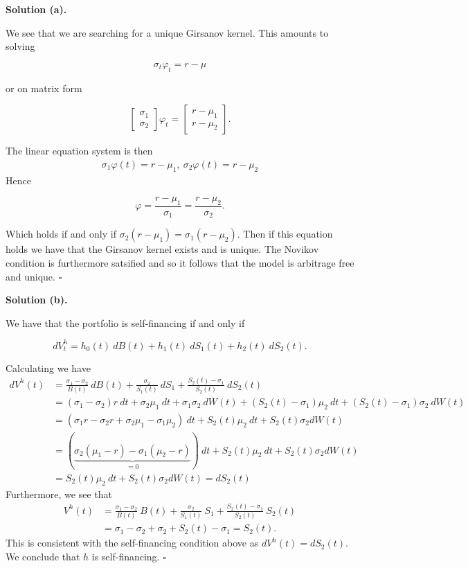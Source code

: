 \documentclass[a4paper,12pt,openany]{book}
\begin{document}
\textbf{Solution (a).}

We see that we are searching for a unique Girsanov kernel. This amounts to solving

\[
\sigma_t\varphi_t=r-\mu
\]

or on matrix form

\[
\begin{bmatrix}
\sigma_1 \\
\sigma_2
\end{bmatrix}
\varphi_t=
\begin{bmatrix}
r-\mu_1\\
r-\mu_2
\end{bmatrix}.
\]

The linear equation system is then
\begin{align*}
\sigma_1\varphi(t)=r-\mu_1,\ \sigma_2\varphi(t)=r-\mu_2
\end{align*}
Hence

\[
\varphi=\frac{r-\mu_1}{\sigma_1}=\frac{r-\mu_2}{\sigma_2}.
\]

Which holds if and only if \(\sigma_2(r-\mu_1)=\sigma_1(r-\mu_2)\). Then if this equation holds we have that the Girsanov kernel exists and is unique. The Novikov condition is furthermore satsified and so it follows that the model is arbitrage free and unique. \(\square\)

\noindent\makebox[\linewidth]{\rule{\textwidth}{0.4pt}}

\textbf{Solution (b).}

We have that the portfolio is self-financing if and only if

\[
dV_t^h=h_0(t)\ dB(t)+h_1(t)\ dS_1(t)+h_2(t)\ dS_2(t).
\]

Calculating we have
\begin{align*}
dV^h(t)&=\frac{\sigma_1-\sigma_2}{B(t)}\ dB(t)+\frac{\sigma_2}{S_1(t)}\ dS_1+\frac{S_2(t)-\sigma_1}{S_2(t)}\ dS_2(t)\\
&=(\sigma_1-\sigma_2)r\ dt+\sigma_2\mu_1\ dt+\sigma_1\sigma_2\ dW(t)+(S_2(t)-\sigma_1)\mu_2\ dt+(S_2(t)-\sigma_1)\sigma_2\ dW(t)\\
&=(\sigma_1r-\sigma_2r+\sigma_2\mu_1-\sigma_1\mu_2)\ dt+S_2(t)\mu_2\ dt+S_2(t)\sigma_2dW(t)\\
&=(\underbrace{\sigma_2(\mu_1-r)-\sigma_1(\mu_2-r)}_{=0})\ dt+S_2(t)\mu_2\ dt+S_2(t)\sigma_2dW(t)\\
&=S_2(t)\mu_2\ dt+S_2(t)\sigma_2dW(t)=dS_2(t)
\end{align*}
Furthermore, we see that
\begin{align*}
V^h(t)&=\frac{\sigma_1-\sigma_2}{B(t)}\ B(t)+\frac{\sigma_2}{S_1(t)}\ S_1+\frac{S_2(t)-\sigma_1}{S_2(t)}\ S_2(t)\\
&=\sigma_1-\sigma_2+\sigma_2+S_2(t)-\sigma_1=S_2(t).
\end{align*}
This is consistent with the self-financing condition above as \(dV^h(t)=dS_2(t)\). We conclude that \(h\) is self-financing. \(\square\)
\end{document}
